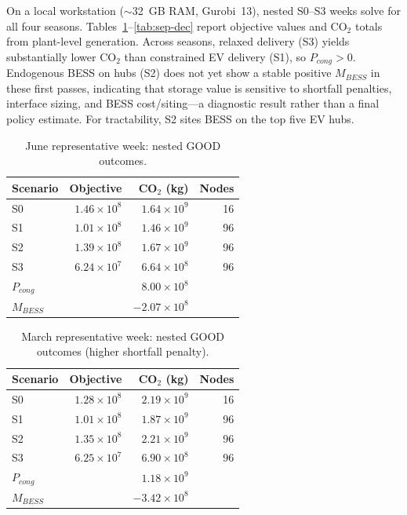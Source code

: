 \documentclass[11pt]{article}
\begin{document}
On a local workstation (\(\sim\)32~GB RAM, Gurobi~13), nested S0--S3 weeks solve for all four seasons. Tables~\ref{tab:june}--\ref{tab:sep-dec} report objective values and CO\(_2\) totals from plant-level generation. Across seasons, relaxed delivery (S3) yields substantially lower CO\(_2\) than constrained EV delivery (S1), so \(P_{cong}>0\). Endogenous BESS on hubs (S2) does not yet show a stable positive \(M_{BESS}\) in these first passes, indicating that storage value is sensitive to shortfall penalties, interface sizing, and BESS cost/siting---a diagnostic result rather than a final policy estimate. For tractability, S2 sites BESS on the top five EV hubs.

\begin{table}[htbp]
\centering
\caption{June representative week: nested GOOD outcomes.}
\label{tab:june}
\begin{tabular}{lrrr}
\toprule
Scenario & Objective & CO\(_2\) (kg) & Nodes \\
\midrule
S0 & \(1.46\times10^8\) & \(1.64\times10^9\) & 16 \\
S1 & \(1.01\times10^8\) & \(1.46\times10^9\) & 96 \\
S2 & \(1.39\times10^8\) & \(1.67\times10^9\) & 96 \\
S3 & \(6.24\times10^7\) & \(6.64\times10^8\) & 96 \\
\midrule
\(P_{cong}\) & & \(8.00\times10^8\) & \\
\(M_{BESS}\) & & \(-2.07\times10^8\) & \\
\bottomrule
\end{tabular}
\end{table}

\begin{table}[htbp]
\centering
\caption{March representative week: nested GOOD outcomes (higher shortfall penalty).}
\label{tab:march}
\begin{tabular}{lrrr}
\toprule
Scenario & Objective & CO\(_2\) (kg) & Nodes \\
\midrule
S0 & \(1.28\times10^8\) & \(2.19\times10^9\) & 16 \\
S1 & \(1.01\times10^8\) & \(1.87\times10^9\) & 96 \\
S2 & \(1.35\times10^8\) & \(2.21\times10^9\) & 96 \\
S3 & \(6.25\times10^7\) & \(6.90\times10^8\) & 96 \\
\midrule
\(P_{cong}\) & & \(1.18\times10^9\) & \\
\(M_{BESS}\) & & \(-3.42\times10^8\) & \\
\bottomrule
\end{tabular}
\end{table}
\end{document}
